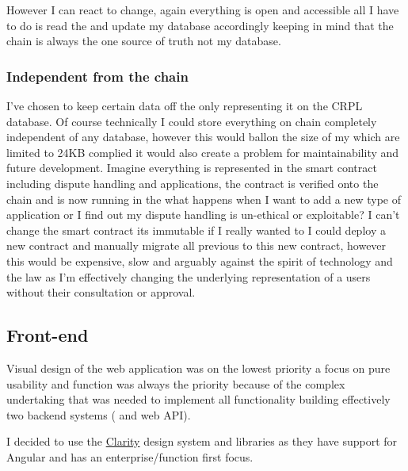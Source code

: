 However I can react to change, again everything is open and accessible all I have to do is read the  and update my database accordingly keeping in mind that the chain is always the one source of truth not my database.

\subsubsection{Independent from the chain}

I've chosen to keep certain data off the  only representing it on the CRPL database. Of course technically I could store everything on chain completely independent of any database, however this would ballon the size of my  which are limited to 24KB complied it would also create a problem for maintainability and future development. 
Imagine everything is represented in the smart contract including dispute handling and applications, the contract is verified onto the chain and is now running in the  what happens when I want to add a new type of application or I find out my dispute handling is un-ethical or exploitable? I can't change the smart contract its immutable if I really wanted to I could deploy a new contract and manually migrate all previous  to this new contract, however this would be expensive, slow and arguably against the spirit of  technology and the law as I'm effectively changing the underlying representation of a users  without their consultation or approval.

\subsection{Front-end}

Visual design of the web application was on the lowest priority a focus on pure usability and function was always the priority because of the complex undertaking that was needed to implement all functionality building effectively two backend systems ( and web API).

I decided to use the \href{https://clarity.design/}{Clarity} design system and libraries as they have support for Angular and has an enterprise/function first focus.

